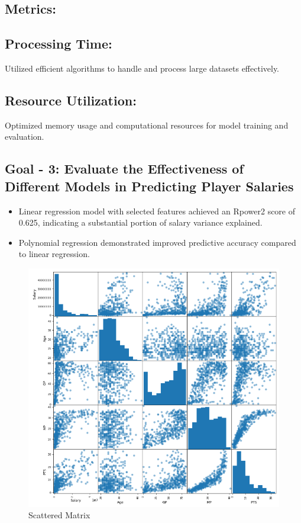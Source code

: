 \documentclass{article}
\begin{document}
\subsection*{Metrics:}

\subsection*{Processing Time:}
Utilized efficient algorithms to handle and process large datasets effectively.
\subsection*{Resource Utilization:} 
Optimized memory usage and computational resources for model training and evaluation.


\subsection*{Goal - 3: Evaluate the Effectiveness of Different Models in Predicting Player Salaries}
\begin{itemize}
    \item Linear regression model with selected features achieved an Rpower2 score of 0.625, indicating a substantial portion of salary variance explained.
    \item Polynomial regression demonstrated improved predictive accuracy compared to linear regression.
\end{itemize}

\FloatBarrier
\begin{figure}[h]
    \centering
    \includegraphics[width=0.9\linewidth]{ScatteredMatrix.png}
    \caption{Scattered Matrix}
    \label{fig:confusion_matrix_code}
\end{figure}
\end{document}
